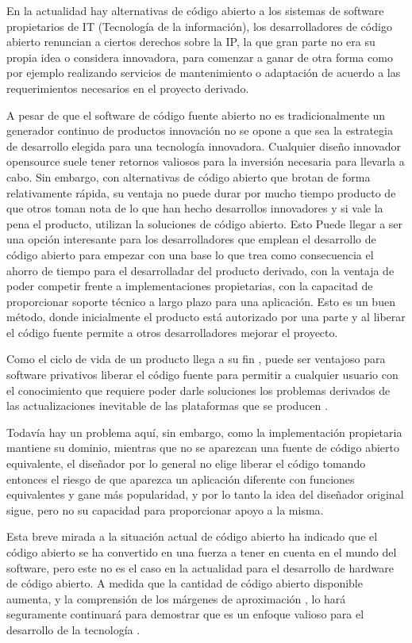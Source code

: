 En la actualidad hay alternativas de código abierto a los sistemas de software propietarios de IT (Tecnología de la información),  los desarrolladores de código abierto renuncian a ciertos derechos sobre la IP, la que gran parte no era su propia idea o considera innovadora, para comenzar a ganar de otra forma como por ejemplo realizando servicios de mantenimiento o adaptación de acuerdo a las requerimientos necesarios en el proyecto derivado.

A pesar de que el software de código fuente abierto no es tradicionalmente un generador continuo de productos innovación no se opone a que sea la estrategia de desarrollo elegida para una tecnología innovadora. Cualquier diseño innovador opensource suele tener retornos valiosos para la inversión necesaria para llevarla a cabo. Sin embargo, con alternativas de código abierto que brotan de forma relativamente rápida, su ventaja no puede durar por mucho tiempo producto de que otros toman nota de lo que han hecho desarrollos innovadores y si vale la pena el producto, utilizan la soluciones de código abierto. Esto  Puede llegar a ser una opción interesante para los desarrolladores que emplean el desarrollo de código abierto para empezar con una base lo que trea como consecuencia el ahorro de tiempo para el desarrolladar del producto derivado, con la ventaja  de poder competir frente a  implementaciones propietarias, con la capacitad de proporcionar soporte técnico a largo plazo para una aplicación. Esto es un buen método, donde inicialmente el producto está autorizado por una parte y al liberar  el código fuente permite a otros desarrolladores mejorar el proyecto.

Como el ciclo de vida de un producto llega a su fin , puede ser ventajoso para software privativos liberar el código fuente para permitir a cualquier usuario con el conocimiento que requiere poder darle soluciones los problemas derivados de las actualizaciones inevitable de las plataformas que se producen . 

Todavía hay un problema aquí, sin embargo, como la implementación propietaria
mantiene su dominio, mientras que no se aparezcan una fuente de código abierto equivalente, el diseñador por lo general no elige liberar el código tomando entonces el riesgo de que aparezca un aplicación diferente con funciones equivalentes y gane más popularidad,  y por lo tanto la idea del diseñador original sigue, pero no su capacidad para proporcionar apoyo a la misma.

Esta breve mirada a la situación actual de código abierto ha indicado que el código abierto
se ha convertido en una fuerza a tener en cuenta en el mundo del software, pero este no es el caso en la actualidad para el desarrollo de hardware de código abierto.
 A medida que la cantidad de código abierto disponible aumenta, y la comprensión de los márgenes de aproximación , lo hará
seguramente continuará para demostrar que es un enfoque valioso para el desarrollo de
la tecnología .

